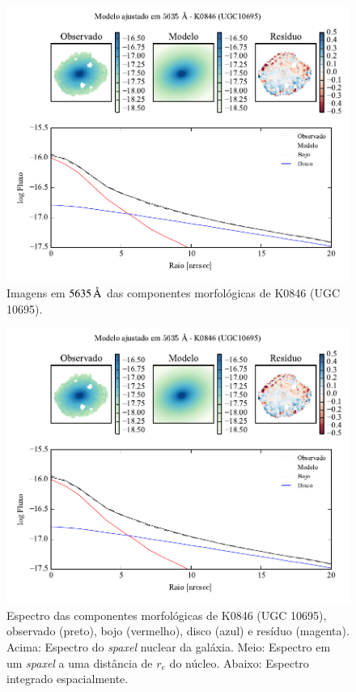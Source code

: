 \begin{figure}
	\includegraphics[page=3]{figuras-decomp/K0846_sample006a}
	\caption[Imagens em $5635\,\angstrom$ das componentes morfológicas de K0846
	(UGC 10695)]
	{Imagens em $5635\,\angstrom$ das componentes morfológicas de K0846
	(UGC 10695).}
	\label{fig:decompImages:K0846}
\end{figure}

\begin{figure}
	\includegraphics[page=4]{figuras-decomp/K0846_sample006a}
	\caption[Espectro das componentes morfológicas de K0846 (UGC 10695)]
	{Espectro das componentes morfológicas de K0846 (UGC 10695),
	observado (preto), bojo (vermelho), disco (azul) e resíduo (magenta). Acima:
	Espectro do {\em spaxel} nuclear da galáxia. Meio: Espectro em um {\em spaxel}
	a uma distância de $r_e$ do núcleo. Abaixo: Espectro integrado espacialmente.}
	\label{fig:decompSpectra:K0846}
\end{figure}

